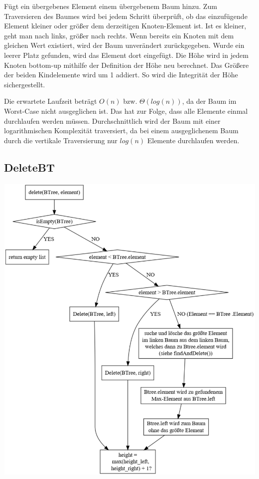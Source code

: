 \documentclass[11pt]{article}
\begin{document}
    Fügt ein übergebenes Element einem übergebenem Baum hinzu.
    Zum Traversieren des Baumes wird bei jedem Schritt überprüft,
    ob das einzufügende Element kleiner oder größer dem derzeitigen Knoten-Element ist.
    Ist es kleiner, geht man nach links, größer nach rechts.
    Wenn bereits ein Knoten mit dem gleichen Wert existiert, wird der Baum
    unverändert zurückgegeben.
    Wurde ein leerer Platz gefunden, wird das Element dort eingefügt.
    Die Höhe wird in jedem Knoten bottom-up mithilfe der Definition der Höhe neu berechnet. Das Größere der beiden Kindelemente wird um 1 addiert. So wird die Integrität der Höhe sichergestellt.


    Die erwartete Laufzeit beträgt
    \begin{math}
        O(n)
    \end {math}
    bzw.
    \begin{math}
        \Theta (log (n))
    \end{math},
    da der Baum im Worst-Case nicht ausgeglichen ist.
    Das hat zur Folge, dass alle Elemente einmal durchlaufen werden müssen.
    Durchschnittlich wird der Baum mit einer logarithmischen Komplexität
    traversiert, da bei einem ausgeglichenem Baum durch die vertikale
    Traversierung nur
    \begin{math}
        log (n)
    \end{math}
    Elemente durchlaufen werden.

    \subsection{DeleteBT}\label{subsec:deletebt}

    \begin{center}
        \includegraphics[width=0.8\columnwidth] {delete.pdf}
    \end{center}
\end{document}

